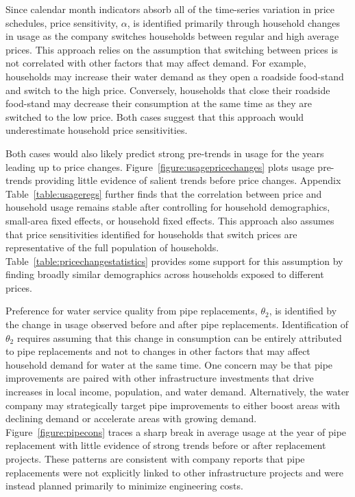 \documentclass[12pt,table]{article}
\begin{document}
Since calendar month indicators absorb all of the time-series variation in price schedules, price sensitivity, $\alpha$, is identified primarily through household changes in usage as the company switches households between regular and high average prices.  This approach relies on the assumption that switching between prices is not correlated with other factors that may affect demand.  For example, households may increase their water demand as they open a roadside food-stand and switch to the high price.  Conversely, households that close their roadside food-stand may decrease their consumption at the same time as they are switched to the low price.  Both cases suggest that this approach would underestimate household price sensitivities.  

Both cases would also likely predict strong pre-trends in usage for the years leading up to price changes.  Figure~\ref{figure:usagepricechanges} plots usage pre-trends providing little evidence of salient trends before price changes.  Appendix Table~\ref{table:usageregs} further finds that the correlation between price and household usage remains stable after controlling for household demographics, small-area fixed effects, or household fixed effects.  This approach also assumes that price sensitivities identified for households that switch prices are representative of the full population of households.  Table~\ref{table:pricechangestatistics} provides some support for this assumption by finding broadly similar demographics across households exposed to different prices.  

Preference for water service quality from pipe replacements, $\theta_2$, is identified by the change in usage observed before and after pipe replacements.  Identification of $\theta_2$ requires assuming that this change in consumption can be entirely attributed to pipe replacements and not to changes in other factors that may affect household demand for water at the same time.  One concern may be that pipe improvements are paired with other infrastructure investments that drive increases in local income, population, and water demand.  Alternatively, the water company may strategically target pipe improvements to either boost areas with declining demand or accelerate areas with growing demand.  Figure~\ref{figure:pipecons} traces a sharp break in average usage at the year of pipe replacement with little evidence of strong trends before or after replacement projects.  These patterns are consistent with company reports that pipe replacements were not explicitly linked to other infrastructure projects and were instead planned primarily to minimize engineering costs.
\end{document}
